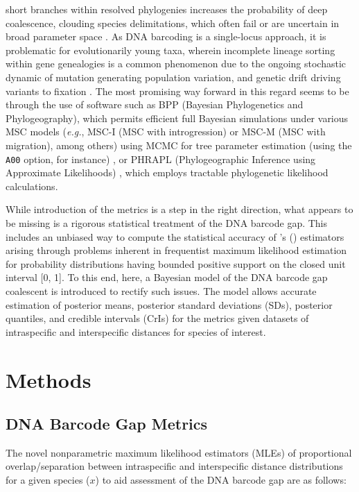 \documentclass[12pt]{article}
\begin{document}
short branches within resolved phylogenies increases the probability of deep coalescence, clouding species delimitations, which often fail or are uncertain in broad parameter space \citep{carstens2013how, hickerson2006dna, rannala2015art}. As DNA barcoding is a single-locus approach, it is problematic for evolutionarily young taxa, wherein incomplete lineage sorting within gene genealogies is a common phenomenon due to the ongoing stochastic dynamic of mutation generating population variation, and genetic drift driving variants to fixation \citep{rannala2015art}. The most promising way forward in this regard seems to be through the use of software such as BPP (Bayesian Phylogenetics and Phylogeography), which permits efficient full Bayesian simulations under various MSC models (\textit{e.g.}, MSC-I (MSC with  introgression) or MSC-M (MSC with migration), among others) using MCMC for tree parameter estimation (using the {\tt A00} option, for instance) \citep{flouri2018species}, or PHRAPL (Phylogeographic Inference using Approximate Likelihoods) \citep{jackson2017species, jackson2017phrapl}, which employs tractable phylogenetic likelihood calculations. 

While introduction of the metrics is a step in the right direction, what appears to be missing is a rigorous statistical treatment of the DNA barcode gap. This includes an unbiased way to compute the statistical accuracy of \citeauthor{phillips2024measure}'s (\citeyear{phillips2024measure}) estimators arising through problems inherent in frequentist maximum likelihood estimation for probability distributions having bounded positive support on the closed unit interval [0, 1]. To this end, here, a Bayesian model of the DNA barcode gap coalescent is introduced to rectify such issues. The model allows accurate estimation of posterior means, posterior standard deviations (SDs), posterior quantiles, and credible intervals (CrIs) for the metrics given datasets of intraspecific and interspecific distances for species of interest.

\section{Methods}

\subsection{DNA Barcode Gap Metrics}

The novel nonparametric maximum likelihood estimators (MLEs) of proportional \\ overlap/separation between intraspecific and interspecific distance distributions for a given species ($x$) to aid assessment of the DNA barcode gap are as follows:
\end{document}
